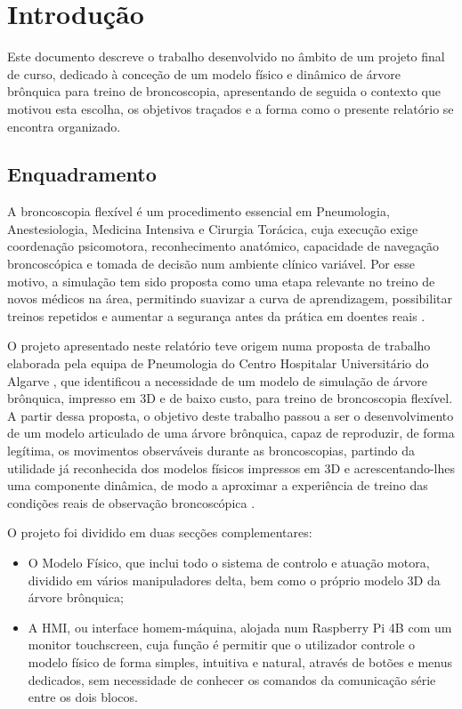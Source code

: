 \chapter{Introdução}

Este documento descreve o trabalho desenvolvido no âmbito de um projeto final de curso, dedicado à conceção de um modelo físico e dinâmico de árvore brônquica para treino de broncoscopia, apresentando de seguida o contexto que motivou esta escolha, os objetivos traçados e a forma como o presente relatório se encontra organizado.

\section{Enquadramento}
A broncoscopia flexível é um procedimento essencial em Pneumologia, Anestesiologia, Medicina Intensiva e Cirurgia Torácica, cuja execução exige coordenação psicomotora, reconhecimento anatómico, capacidade de navegação broncoscópica e tomada de decisão num ambiente clínico variável. Por esse motivo, a simulação tem sido proposta como uma etapa relevante no treino de novos médicos na área, permitindo suavizar a curva de aprendizagem, possibilitar treinos repetidos e aumentar a segurança antes da prática em doentes reais \parencite{Davoudi2008,Kennedy2013,Fielding2014,Nilsson2017,Gopal2018}.

O projeto apresentado neste relatório teve origem numa proposta de trabalho elaborada pela equipa de Pneumologia do Centro Hospitalar Universitário do Algarve \parencite{Barros2023}, que identificou a necessidade de um modelo de simulação de árvore brônquica, impresso em 3D e de baixo custo, para treino de broncoscopia flexível. A partir dessa proposta, o objetivo deste trabalho passou a ser o desenvolvimento de um modelo articulado de uma árvore brônquica, capaz de reproduzir, de forma legítima, os movimentos observáveis durante as broncoscopias, partindo da utilidade já reconhecida dos modelos físicos impressos em 3D e acrescentando-lhes uma componente dinâmica, de modo a aproximar a experiência de treino das condições reais de observação broncoscópica \parencite{Pedersen2017,Fu2023}.

O projeto foi dividido em duas secções complementares:
\begin{itemize}
  \item O Modelo Físico, que inclui todo o sistema de controlo e atuação motora, dividido em vários manipuladores delta, bem como o próprio modelo 3D da árvore brônquica;
  \item A HMI, ou interface homem-máquina, alojada num Raspberry Pi 4B com um monitor touchscreen, cuja função é permitir que o utilizador controle o modelo físico de forma simples, intuitiva e natural, através de botões e menus dedicados, sem necessidade de conhecer os comandos da comunicação série entre os dois blocos.
\end{itemize}

